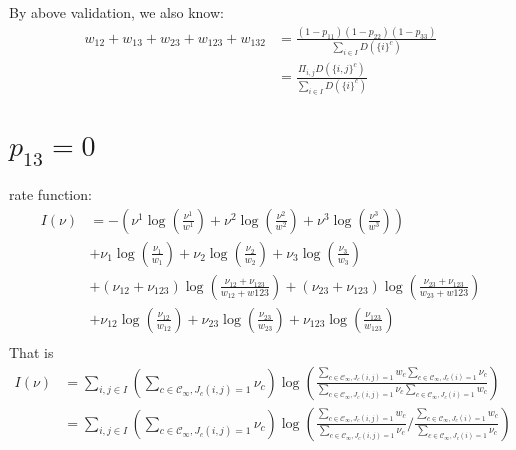 \documentclass[a4paper,11pt]{article}
\begin{document}
By above validation, we also know:
\begin{align*}
    w_{12}+w_{13}+w_{23}+w_{123}+w_{132} &= \frac{(1-p_{11})(1-p_{22})(1-p_{33})}{\sum_{i\in I} D(\{i\}^c)} \\
    &= \frac{\Pi_{i, j} D(\{i, j\}^c)}{\sum_{i\in I} D(\{i\}^c)}
\end{align*}


\section{$p_{13}=0$}
rate function:
\begin{align*}
    I(\nu)
    &= -(\nu^{1} \log (\frac{\nu^{1}}{w^{1}}) + \nu^{2} \log (\frac{\nu^{2}}{w^{2}}) + \nu^{3} \log (\frac{\nu^{3}}{w^{3}})) \\
    &+ \nu_{1} \log (\frac{\nu_{1}}{w_{1}}) + \nu_{2} \log (\frac{\nu_{2}}{w_{2}}) + \nu_{3} \log (\frac{\nu_{3}}{w_{3}}) \\
    &+ (\nu_{12}+\nu_{123}) \log(\frac{\nu_{12}+\nu_{123}}{w_{12}+w{123}}) +
    (\nu_{23}+\nu_{123}) \log(\frac{\nu_{23}+\nu_{123}}{w_{23}+w{123}}) \\
    &+ \nu_{12} \log(\frac{\nu_{12}}{w_{12}}) + \nu_{23} \log(\frac{\nu_{23}}{w_{23}}) + \nu_{123} \log(\frac{\nu_{123}}{w_{123}}) \\
\end{align*}
That is
\begin{align*}
    I(\nu) &=  \sum_{i, j \in I} \left(\sum_{c \in \mathcal{C_{\infty}}, J_c(i, j)=1}
    \nu_c \right) \log(\frac{\sum_{c \in \mathcal{C_{\infty}}, J_c(i, j)=1} w_c \sum_{c \in \mathcal{C_{\infty}}, J_c(i)=1} \nu_c}{\sum_{c \in \mathcal{C_{\infty}}, J_c(i, j)=1} \nu_c \sum_{c \in \mathcal{C_{\infty}}, J_c(i)=1} w_c}) \\
    &= \sum_{i, j \in I} \left(\sum_{c \in \mathcal{C_{\infty}}, J_c(i, j)=1}
    \nu_c \right) \log(\frac{\sum_{c \in \mathcal{C_{\infty}}, J_c(i, j)=1} w_c }{\sum_{c \in \mathcal{C_{\infty}}, J_c(i, j)=1} \nu_c }
    /\frac{\sum_{c \in \mathcal{C_{\infty}}, J_c(i)=1} w_c}{\sum_{c \in \mathcal{C_{\infty}}, J_c(i)=1} \nu_c}) \\
\end{align*}
\end{document}
